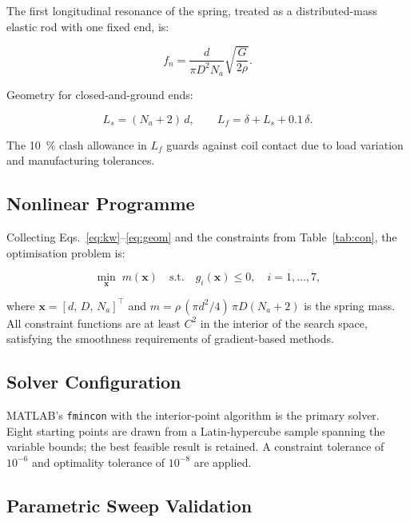 \documentclass[10pt,twocolumn]{article}
\begin{document}
The first longitudinal resonance of the spring, treated as a distributed-mass
elastic rod with one fixed end, is:

\begin{equation}
  f_n = \frac{d}{\pi D^2 N_a} \sqrt{\frac{G}{2\rho}}.
  \label{eq:fn}
\end{equation}

Geometry for closed-and-ground ends:

\begin{equation}
  L_s = (N_a + 2)\,d, \qquad
  L_f = \delta + L_s + 0.1\,\delta.
  \label{eq:geom}
\end{equation}

The \SI{10}{\percent} clash allowance in $L_f$ guards against coil contact
due to load variation and manufacturing tolerances.

\subsection{Nonlinear Programme}

Collecting Eqs.~\eqref{eq:kw}--\eqref{eq:geom} and the constraints from
Table~\ref{tab:con}, the optimisation problem is:

\begin{equation}
  \min_{\mathbf{x}} \; m(\mathbf{x})
  \quad \text{s.t.} \quad g_i(\mathbf{x}) \le 0,
  \quad i = 1,\ldots,7,
  \label{eq:nlp}
\end{equation}

where $\mathbf{x} = [d,\, D,\, N_a]^{\!\top}$ and $m = \rho\,(\pi d^2/4)\,\pi D(N_a+2)$
is the spring mass.
All constraint functions are at least $C^2$ in the interior of the search
space, satisfying the smoothness requirements of gradient-based methods.

\subsection{Solver Configuration}

MATLAB's \texttt{fmincon} with the interior-point algorithm \cite{byrd1999}
is the primary solver.
Eight starting points are drawn from a Latin-hypercube sample spanning
the variable bounds; the best feasible result is retained.
A constraint tolerance of $10^{-6}$ and optimality tolerance of $10^{-8}$
are applied.

\subsection{Parametric Sweep Validation}
\end{document}

